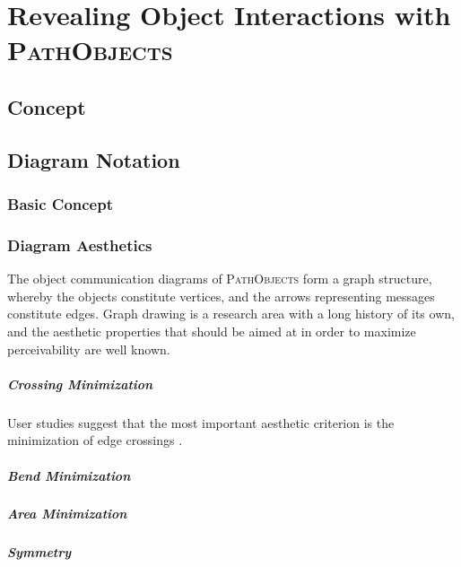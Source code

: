 \chapter{Revealing Object Interactions with \textsc{PathObjects}}
\label{c:approach}

\section{Concept}

\section{Diagram Notation}
\subsection{Basic Concept}
\subsection{Diagram Aesthetics}
The object communication diagrams of \textsc{PathObjects} form a graph structure, whereby the objects constitute vertices, and the arrows representing messages constitute edges.
Graph drawing is a research area with a long history of its own, and the aesthetic properties that should be aimed at in order to maximize perceivability are well known.

\paragraph{Crossing Minimization} User studies suggest that the most important aesthetic criterion is the minimization of edge crossings \cite{purchase_effective_2000, purchase_graph_2004, purchase_graph_2010}.

\paragraph{Bend Minimization}

\paragraph{Area Minimization}

\paragraph{Symmetry}

